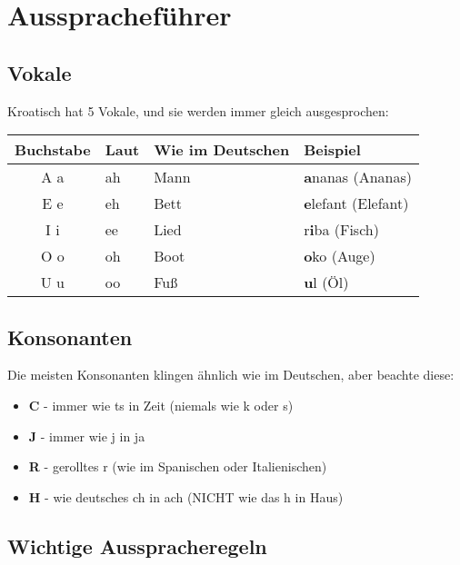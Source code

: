 \section{Ausspracheführer}

\begin{grammar}
\subsection*{Vokale}

Kroatisch hat 5 Vokale, und sie werden immer gleich ausgesprochen:

\begin{center}
\begin{tabular}{clll}
\toprule
Buchstabe & Laut & Wie im Deutschen & Beispiel \\
\midrule
A a & \glqq ah\grqq{} & Mann & \textbf{a}nanas (Ananas) \\
E e & \glqq eh\grqq{} & Bett & \textbf{e}lefant (Elefant) \\
I i & \glqq ee\grqq{} & Lied & r\textbf{i}ba (Fisch) \\
O o & \glqq oh\grqq{} & Boot & \textbf{o}ko (Auge) \\
U u & \glqq oo\grqq{} & Fuß & \textbf{u}l (Öl) \\
\bottomrule
\end{tabular}
\end{center}

\subsection*{Konsonanten}

Die meisten Konsonanten klingen ähnlich wie im Deutschen, aber beachte diese:

\begin{itemize}
    \item \textbf{C} - immer wie \glqq ts\grqq{} in \glqq Zeit\grqq{} (niemals wie \glqq k\grqq{} oder \glqq s\grqq{})
    \item \textbf{J} - immer wie \glqq j\grqq{} in \glqq ja\grqq{}
    \item \textbf{R} - gerolltes \glqq r\grqq{} (wie im Spanischen oder Italienischen)
    \item \textbf{H} - wie deutsches \glqq ch\grqq{} in \glqq ach\grqq{} (NICHT wie das \glqq h\grqq{} in \glqq Haus\grqq{})
\end{itemize}

\subsection*{Wichtige Ausspracheregeln}


\end{grammar}
